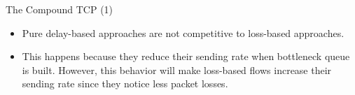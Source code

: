 \begin{frame}{The Compound TCP (1)}
        \begin{itemize}
		\item Pure delay-based approaches are not competitive to
		      loss-based approaches.
		\item This happens because they reduce their sending rate
		      when bottleneck queue is built. However, this behavior will make
		      loss-based flows increase their sending rate since they
		      notice less packet losses.
        \end{itemize}
\end{frame}

